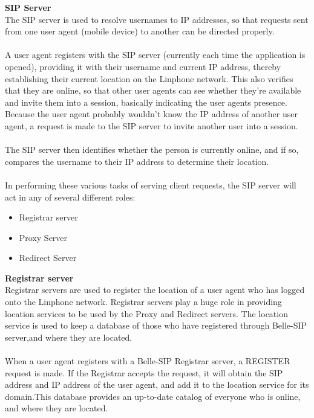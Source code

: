 \documentclass[a4paper]{article}
\begin{document}
\textbf{SIP Server\\}
The SIP server is used to resolve usernames to IP addresses, so that requests sent from one user agent (mobile device)  to another can be directed properly. \\
\\
A user agent registers with the SIP server (currently each time the application is opened), providing it with their username and current IP address, thereby establishing their current location on the Linphone network. This also veriﬁes that they are online, so that other user agents can see whether they’re available and invite them into a session, basically indicating the user agents presence. Because the user agent probably wouldn’t know the IP address of another user agent, a request is made to the SIP server to invite another user into a session.\\
\\
The SIP server then identiﬁes whether the person is currently online, and if so, compares the username to their IP address to determine their location. \\
\\
In performing these various tasks of serving client requests, the SIP server
will act in any of several different roles:
\begin{itemize}
\item Registrar server
\item Proxy Server
\item Redirect Server
\end{itemize}

\textbf{Registrar server\\}
Registrar servers are used to register the location of a user agent who has logged onto the Linphone network. Registrar servers play a huge role in providing location services to be used by the Proxy and Redirect servers. The location service is used to keep a database of those who have registered through Belle-SIP server,and where they are located.\\ 
\\
When a user agent registers with a Belle-SIP Registrar server, a REGISTER request is made. If the Registrar accepts the request, it will obtain the SIP address and IP address of the user agent, and add it to the location service for its domain.This database provides an up-to-date catalog of everyone who is online, and where they are located.
\end{document}
